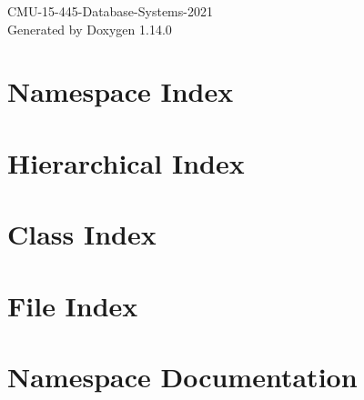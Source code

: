 \documentclass[twoside]{book}
\newcommand{\+}{\discretionary{\mbox{\scriptsize$\hookleftarrow$}}{}{}}
\newcommand{\clearemptydoublepage}{%
    \newpage{\pagestyle{empty}\cleardoublepage}%
  }
\begin{document}
  \raggedbottom
    \hypersetup{pageanchor=false,
                bookmarksnumbered=true,
                pdfencoding=unicode
               }
  \begin{titlepage}
  \vspace*{7cm}
  \begin{center}%
  {\Large CMU-\/15-\/445-\/\+Database-\/\+Systems-\/2021}\\
  \vspace*{1cm}
  {\large Generated by Doxygen 1.14.0}\\
  \end{center}
  \end{titlepage}
  \clearemptydoublepage
  \tableofcontents
  \clearemptydoublepage
  \hypersetup{pageanchor=true}
\chapter{Namespace Index}

\chapter{Hierarchical Index}

\chapter{Class Index}

\chapter{File Index}

\chapter{Namespace Documentation}



\end{document}
